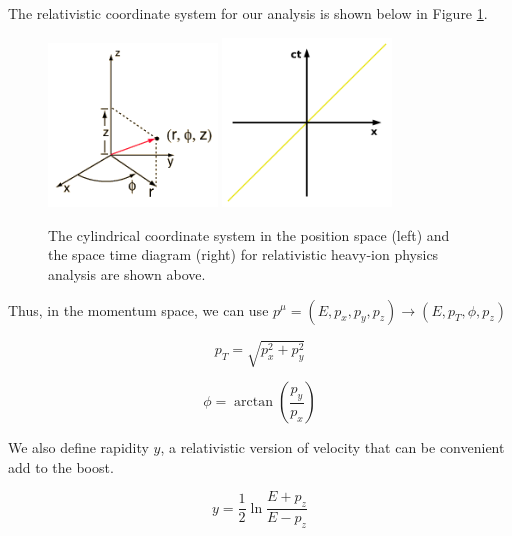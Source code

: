 The relativistic coordinate system for our analysis is shown below in Figure \ref{HICoordinates}. 

\begin{figure}[hbtp]
\begin{center}
\includegraphics[width=0.40\textwidth]{Figures/Chapter1/PosCylindrical.png}
\includegraphics[width=0.40\textwidth]{Figures/Chapter1/STDiagram.png}
\caption{The cylindrical coordinate system in the position space (left) and the space time diagram (right) for relativistic heavy-ion physics analysis are shown above.}
\label{HICoordinates}
\end{center}
\end{figure} 


Thus, in the momentum space, we can use $p^\mu = (E,p_x, p_y, p_z) \rightarrow  (E,p_T, \phi, p_z)$ 

\begin{equation}
p_T = \sqrt{p_x^2 + p_y^2}
\end{equation}

\begin{equation}
\phi = \arctan(\frac{p_y}{p_x})
\end{equation}

We also define rapidity $y$, a relativistic version of velocity that can be convenient add to the boost.

\begin{equation}
y = \frac{1}{2} \ln \frac{E+p_z}{E-p_z}
\end{equation}


